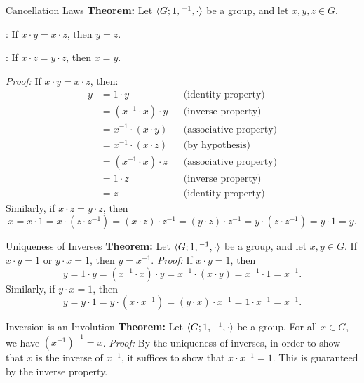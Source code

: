 \begin{thmbox}{Cancellation Laws}
	\textbf{Theorem:} Let ${\langle {G; 1, {}^{-1}, \cdot} \rangle}$ be a group, and let $x, y, z \in G$.
	\begin{dfnitems}
		\item {}: If $x \cdot y = x \cdot z$, then $y = z$.
		\item {}: If $x \cdot z = y \cdot z$, then $x = y$.
	\end{dfnitems}
	\tcblower
	\textit{Proof:} If $x \cdot y = x \cdot z$, then:
	\begin{align*}
		y & = 1 \cdot y                &  & \text{(identity property)}    \\
		& = (x^{-1} \cdot x) \cdot y &  & \text{(inverse property)}     \\
		& = x^{-1} \cdot (x \cdot y) &  & \text{(associative property)} \\
		& = x^{-1} \cdot (x \cdot z) &  & \text{(by hypothesis)}        \\
		& = (x^{-1} \cdot x) \cdot z &  & \text{(associative property)} \\
		& = 1 \cdot z                &  & \text{(inverse property)}     \\
		& = z                        &  & \text{(identity property)}
	\end{align*}
	Similarly, if $x \cdot z = y \cdot z$, then
	\[ x = x \cdot 1 = x \cdot (z \cdot z^{-1}) = (x \cdot z) \cdot z^{-1} = (y \cdot z) \cdot z^{-1} = y \cdot (z \cdot z^{-1}) = y \cdot 1 = y. \]
\end{thmbox}

\begin{thmbox}{Uniqueness of Inverses} \label{grpuniq}
	\textbf{Theorem:} Let ${\langle {G; 1, {}^{-1}, \cdot} \rangle}$ be a group, and let $x, y \in G$. If $x \cdot y = 1$ or $y \cdot x = 1$, then $y = x^{-1}$.
	\tcblower
	\textit{Proof:} If $x \cdot y = 1$, then
	\[ y = 1 \cdot y = (x^{-1} \cdot x) \cdot y = x^{-1} \cdot (x \cdot y) = x^{-1} \cdot 1 = x^{-1}. \]
	Similarly, if $y \cdot x = 1$, then
	\[ y = y \cdot 1 = y \cdot (x \cdot x^{-1}) = (y \cdot x) \cdot x^{-1} = 1 \cdot x^{-1} = x^{-1}. \]
\end{thmbox}

\begin{thmbox}{Inversion is an Involution}
	\textbf{Theorem:} Let ${\langle {G; 1, {}^{-1}, \cdot} \rangle}$ be a group. For all $x \in G$, we have $(x^{-1})^{-1} = x$.
	\tcblower
	\textit{Proof:} By the uniqueness of inverses, in order to show that $x$ is the inverse of $x^{-1}$, it suffices to show that $x \cdot x^{-1} = 1$. This is guaranteed by the inverse property.
\end{thmbox}

